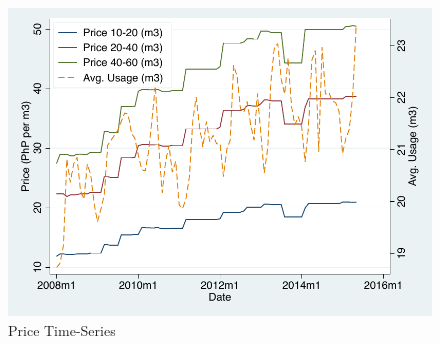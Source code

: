 \documentclass[12pt,table]{article}
\newcommand{\regtext}{
Standard errors are clustered at the small-area level (in parentheses).  The water service area is divided into 2,974 small-areas.
\textsuperscript{c} p$<$0.10,\textsuperscript{b} p$<$0.05,\textsuperscript{a} p$<$0.01 \,\,
}
\begin{document}
% 







\begin{figure}
\caption{Price Time-Series}\label{figure:pricetimeseries}
\begin{center}
\includegraphics[scale=1]{tables/price_series.pdf}
\end{center}
\end{figure}
\end{document}
